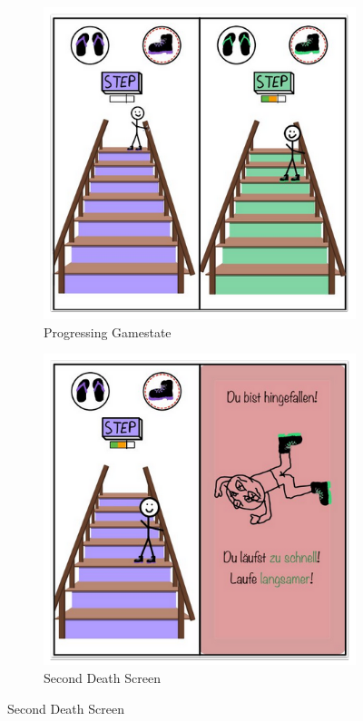 \documentclass{article}
\begin{document}
\begin{figure}[H]
    \vspace{0.5cm}

    \begin{subfigure}[t]{0.45\textwidth}
        \centering
        \includegraphics[width=\textwidth]{./resources/StairMaster_3.png}
        \caption{Progressing Gamestate}
    \end{subfigure}
    \hfill
    \begin{subfigure}[t]{0.45\textwidth}
        \centering
        \includegraphics[width=\textwidth]{./resources/StairMaster_4.png}
        \caption{Second Death Screen}
    \end{subfigure}


\end{figure}
\end{document}
